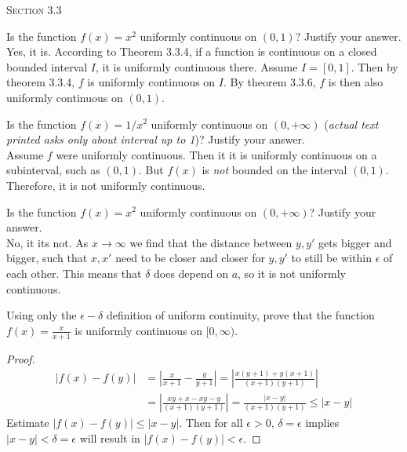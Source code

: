\documentclass[12pt]{article}
\newenvironment{exercise}[2][Exercise]{\begin{trivlist}
\item[\hskip \labelsep {\bfseries #1}\hskip \labelsep {\bfseries #2.}]}{\end{trivlist}}
\begin{document}
\begin{center}
\textsc{\Large Section 3.3}
\end{center}

\begin{exercise}{3.3.1}
Is the function $f(x)=x^2$ uniformly continuous on $(0,1)$? Justify your answer. \\

Yes, it is. According to Theorem 3.3.4, if a function is continuous on a closed bounded interval $I$, it is uniformly continuous there. Assume $I=[0,1]$. Then by theorem 3.3.4, $f$ is uniformly continuous on $I$. By theorem 3.3.6, $f$ is then also uniformly continuous on $(0,1)$.
\end{exercise}


\begin{exercise}{3.3.2}
    Is the function $f(x)=1/x^2$ uniformly continuous on $(0,+\infty)$ (\emph{actual text printed asks only about interval up to 1})? Justify your answer. \\
    
    Assume $f$ were uniformly continuous. Then it it is uniformly continuous on a subinterval, such as $(0,1)$. But $f(x)$ is \emph{not} bounded on the interval $(0,1)$. Therefore, it is not uniformly continuous. 
\end{exercise}


\begin{exercise}{3.3.3}
Is the function $f(x) = x^2$ uniformly continuous on $(0, + \infty)$? Justify your answer.  \\

No, it its not. As $x \to \infty$ we find that the distance between $y,y'$ gets bigger and bigger, such that $x,x'$ need to be closer and closer for $y,y'$ to still be within $\epsilon$ of each other. This means that $\delta$ does depend on $a$, so it is not uniformly continuous. 
\end{exercise}


\begin{exercise}{3.3.4}
    Using only the $\epsilon-\delta$ definition of uniform continuity, prove that the function $f(x)=\frac{x}{x+1}$ is uniformly continuous on $[0,\infty)$.
    
    \begin{proof}
        \begin{align*}
        |f(x)-f(y)| &= | \frac{x}{x+1} - \frac{y}{y+1} | = |\frac{x(y+1) + y(x+1)}{(x+1)(y+1)}| \\
         &= |\frac{xy+x-xy-y}{(x+1)(y+1)}| = \frac{|x-y|}{(x+1)(y+1)} \leq |x-y|
         \end{align*}
    Estimate $|f(x)-f(y)|\leq |x-y|$. Then for all $\epsilon> 0$, $\delta = \epsilon$ implies $|x-y|<\delta = \epsilon$ will result in $|f(x)-f(y)|<\epsilon$.
    \end{proof}
\end{exercise}
\end{document}
